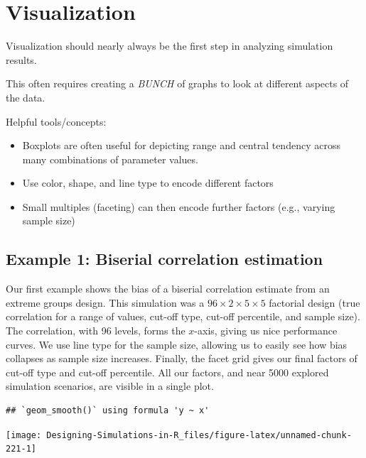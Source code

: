\documentclass[
]{book}
\providecommand{\tightlist}{%
  \setlength{\itemsep}{0pt}\setlength{\parskip}{0pt}}
\begin{document}
\hypertarget{visualization}{%
\section{Visualization}\label{visualization}}

Visualization should nearly always be the first step in analyzing simulation results.

This often requires creating a \emph{BUNCH} of graphs to look at different aspects of the data.

Helpful tools/concepts:

\begin{itemize}
\tightlist
\item
  Boxplots are often useful for depicting range and central tendency across many combinations of parameter values.
\item
  Use color, shape, and line type to encode different factors
\item
  Small multiples (faceting) can then encode further factors (e.g., varying sample size)
\end{itemize}

\hypertarget{example-1-biserial-correlation-estimation}{%
\subsection{Example 1: Biserial correlation estimation}\label{example-1-biserial-correlation-estimation}}

Our first example shows the bias of a biserial correlation estimate from an extreme groups design.
This simulation was a \(96 \times 2 \times 5 \times 5\) factorial design (true correlation for a range of values, cut-off type, cut-off percentile, and sample size).
The correlation, with 96 levels, forms the \(x\)-axis, giving us nice performance curves.
We use line type for the sample size, allowing us to easily see how bias collapses as sample size increases.
Finally, the facet grid gives our final factors of cut-off type and cut-off percentile.
All our factors, and near 5000 explored simulation scenarios, are visible in a single plot.

\begin{verbatim}
## `geom_smooth()` using formula 'y ~ x'
\end{verbatim}

\begin{center}\texttt{[image: Designing-Simulations-in-R\_files/figure-latex/unnamed-chunk-221-1]} \end{center}
\end{document}
